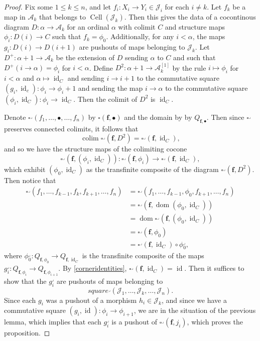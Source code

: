 \documentclass[leqno]{article}
\numberwithin{equation}{subsection}
\theoremstyle{plain}   %
\theoremstyle{remark}
\theoremstyle{plain}
\DeclareMathOperator{\id}{id}
\DeclareMathOperator{\colim}{colim}
\begin{document}
\begin{proof}
	Fix some \(1\leq k\leq n\), and let \(f_i:X_i\to Y_i \in \mathscr{J}_i\) for each \(i\neq k\). 
	Let \(f_k\) be a map in \(\mathcal{A}_k\) that belongs to \(\operatorname{Cell}(\mathscr{J}_k)\).  Then this gives the data of a cocontinous diagram \(D:\alpha \to \mathcal{A}_k\) for an ordinal \(\alpha\) with colimit \(C\) and structure maps \(\phi_i: D(i)\to C\) such that \(f_k=\phi_0\).  Additionally, for any \(i <\alpha\), the maps \(g_i:D(i)\to D(i+1)\) are pushouts of maps belonging to \(\mathscr{J}_k\). Let \(D^+:\alpha+1\to \mathcal{A}_k\) be the extension of \(D\) sending \(\alpha\) to \(C\) and such that \(D^+(i\to \alpha)=\phi_i\) for \(i<\alpha\).  Define \(D^2: \alpha+1\to \mathcal{A}_k^{[1]}\) by the rule \(i\mapsto \phi_i\) for \(i<\alpha\) and \(\alpha\mapsto \id_C\) and sending \(i\to i+1\) to the commutative square \((g_i,\id_c):\phi_i\to \phi_i+1\) and sending the map \(i\to \alpha\) to the commutative square \((\phi_i,\id_C):\phi_i\to \id_C\).  Then the colimit of \(D^2\) is \(\id_C\).  

	Denote \(\square^\lrcorner(f_1,\dots,\bullet,\dots, f_n)\) by \(\square(\mathbf{f},\bullet)\) and the domain by by \(Q_{\mathbf{f},\bullet}\).  Then since \(\square^\lrcorner\) preserves connected colimits, it follows that 
	\[\colim\square^\lrcorner(\mathbf{f},D^2)=\square^\lrcorner(\mathbf{f},\id_C),\]
	and so we have the structure maps of the colimiting cocone
	\[\square^\lrcorner(\mathbf{f},(\phi_i,\id_C)): \square^\lrcorner(\mathbf{f},\phi_i) \to \square^\lrcorner(\mathbf{f},\id_C),\]
	which exhibit \((\phi_0,\id_C)\) as the transfinite composite of the diagram \(\square^\lrcorner(\mathbf{f},D^2)\).  
	Then notice that
	\begin{align*}
		\square^\lrcorner(f_1,\dots,f_{k-1},f_k,f_{k+1},\dots,f_n)&=\square^\lrcorner(f_1,\dots,f_{k-1},\phi_0,f_{k+1},\dots,f_n)\\
		&=\square^\lrcorner(\mathbf{f},\operatorname{dom}(\phi_0,\id_C))\\
		&=\operatorname{dom}\square^\lrcorner(\mathbf{f},(\phi_0,\id_C))\\
		&=\square^\lrcorner(\mathbf{f},\phi_0)\\
		&=\square^\lrcorner(\mathbf{f},\id_C)\circ \phi_0^\lrcorner,
	\end{align*}
	where \(\phi_0^\lrcorner:Q_{\mathbf{f},\phi_0}\to Q_{\mathbf{f},\id_C}\) is the transfinite composite of the maps \(g_i^\lrcorner: Q_{\mathbf{f},\phi_i} \to Q_{\mathbf{f},\phi_{i+1}}\).  By \ref{corneridentities}, \(\square^\lrcorner(\mathbf{f},\id_C)= \id\).  Then it suffices to show that the \(g_i^\lrcorner\) are pushouts of maps belonging to 
	\[square^\lrcorner(\mathscr{J}_1,\dots, \mathscr{J}_k,\dots ,\mathscr{J}_n).\]
	Since each \(g_i\) was a pushout of a morphism \(h_i \in \mathscr{J}_k\), and since we have a commutative square \((g_i,\id):\phi_i\to \phi_{i+1}\), we are in the situation of the previous lemma, which implies that each \(g_i^\lrcorner\) is a pushout of \(\square^\lrcorner(\mathbf{f},j_i)\), which proves the proposition.
\end{proof}
\end{document}
